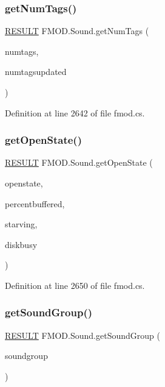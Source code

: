 \subsubsection{\texorpdfstring{get\+Num\+Tags()}{getNumTags()}}
{\footnotesize\ttfamily \hyperlink{namespace_f_m_o_d_a305d1176ef3f8c8815861a60407ac33d}{R\+E\+S\+U\+LT} F\+M\+O\+D.\+Sound.\+get\+Num\+Tags (\begin{DoxyParamCaption}\item[{out int}]{numtags,  }\item[{out int}]{numtagsupdated }\end{DoxyParamCaption})}



Definition at line 2642 of file fmod.\+cs.

\mbox{\label{class_f_m_o_d_1_1_sound_a3f44b26ec0592180feafc78b35d98f15}} 
\subsubsection{\texorpdfstring{get\+Open\+State()}{getOpenState()}}
{\footnotesize\ttfamily \hyperlink{namespace_f_m_o_d_a305d1176ef3f8c8815861a60407ac33d}{R\+E\+S\+U\+LT} F\+M\+O\+D.\+Sound.\+get\+Open\+State (\begin{DoxyParamCaption}\item[{out \hyperlink{namespace_f_m_o_d_a9f6c0e7171206891a54ae2a2ba257000}{O\+P\+E\+N\+S\+T\+A\+TE}}]{openstate,  }\item[{out uint}]{percentbuffered,  }\item[{out bool}]{starving,  }\item[{out bool}]{diskbusy }\end{DoxyParamCaption})}



Definition at line 2650 of file fmod.\+cs.

\mbox{\label{class_f_m_o_d_1_1_sound_a0fe1b9bd666f25faafd5a93167a2580c}} 
\subsubsection{\texorpdfstring{get\+Sound\+Group()}{getSoundGroup()}}
{\footnotesize\ttfamily \hyperlink{namespace_f_m_o_d_a305d1176ef3f8c8815861a60407ac33d}{R\+E\+S\+U\+LT} F\+M\+O\+D.\+Sound.\+get\+Sound\+Group (\begin{DoxyParamCaption}\item[{out \hyperlink{class_f_m_o_d_1_1_sound_group}{Sound\+Group}}]{soundgroup }\end{DoxyParamCaption})}



